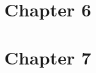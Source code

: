 \documentclass{wileySix}
\begin{document}
\chapter{Chapter 6}

%
%

\chapter{Chapter 7}

%
%

 



\printindex


\end{document}
